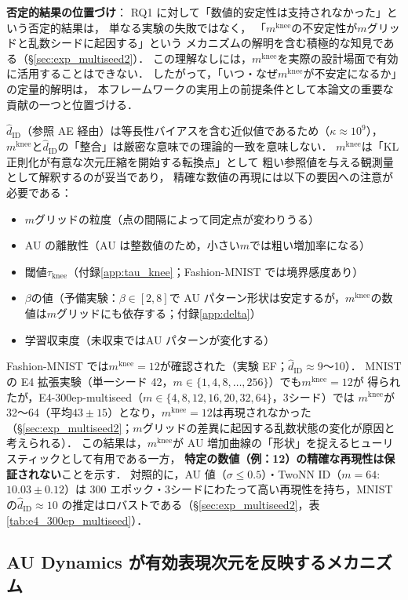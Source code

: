 \documentclass[11pt,a4paper]{jsarticle}
\newcommand{\kap}{\kappa}
\newcommand{\mknee}{m^{\mathrm{knee}}}
\begin{document}
\textbf{否定的結果の位置づけ}：
RQ1 に対して「数値的安定性は支持されなかった」という否定的結果は，
単なる実験の失敗ではなく，
「$\mknee$の不安定性が$m$グリッドと乱数シードに起因する」という
メカニズムの解明を含む積極的な知見である（§\ref{sec:exp_multiseed2}）．
この理解なしには，$\mknee$を実際の設計場面で有効に活用することはできない．
したがって，「いつ・なぜ$\mknee$が不安定になるか」の定量的解明は，
本フレームワークの実用上の前提条件として本論文の重要な貢献の一つと位置づける．

$\hat{d}_\mathrm{ID}$（参照 AE 経由）は等長性バイアスを含む近似値であるため（$\kap \approx 10^9$），
$\mknee$と$\hat{d}_\mathrm{ID}$の「整合」は厳密な意味での理論的一致を意味しない．
$\mknee$は「KL 正則化が有意な次元圧縮を開始する転換点」として
粗い参照値を与える観測量として解釈するのが妥当であり，
精確な数値の再現には以下の要因への注意が必要である：
\begin{itemize}
  \item $m$グリッドの粒度（点の間隔によって同定点が変わりうる）
  \item AU の離散性（AU は整数値のため，小さい$m$では粗い増加率になる）
  \item 閾値$\tau_{\mathrm{knee}}$（付録\ref{app:tau_knee}；Fashion-MNIST では境界感度あり）
  \item $\beta$の値（予備実験：$\beta \in [2, 8]$で AU パターン形状は安定するが，$\mknee$の数値は$m$グリッドにも依存する；付録\ref{app:delta}）
  \item 学習収束度（未収束ではAU パターンが変化する）
\end{itemize}

Fashion-MNIST では$\mknee = 12$が確認された（実験 EF；$\hat{d}_\mathrm{ID} \approx 9$〜10）．
MNIST の E4 拡張実験（単一シード 42，$m \in \{1, 4, 8, \ldots, 256\}$）でも$\mknee = 12$が
得られたが，E4-300ep-multiseed（$m \in \{4, 8, 12, 16, 20, 32, 64\}$，3シード）では
$\mknee$が 32〜64（平均$43 \pm 15$）となり，$\mknee = 12$は再現されなかった
（§\ref{sec:exp_multiseed2}；$m$グリッドの差異に起因する乱数状態の変化が原因と考えられる）．
この結果は，$\mknee$が AU 増加曲線の「形状」を捉えるヒューリスティックとして有用である一方，
\textbf{特定の数値（例：12）の精確な再現性は保証されない}ことを示す．
対照的に，AU 値（$\sigma \leq 0.5$）・TwoNN ID（$m=64$: $10.03 \pm 0.12$）は
300 エポック・3シードにわたって高い再現性を持ち，MNIST の$\hat{d}_\mathrm{ID} \approx 10$
の推定はロバストである（§\ref{sec:exp_multiseed2}，表\ref{tab:e4_300ep_multiseed}）．

\subsection{AU Dynamics が有効表現次元を反映するメカニズム}\label{sec:disc_au_dynamics}
\end{document}
